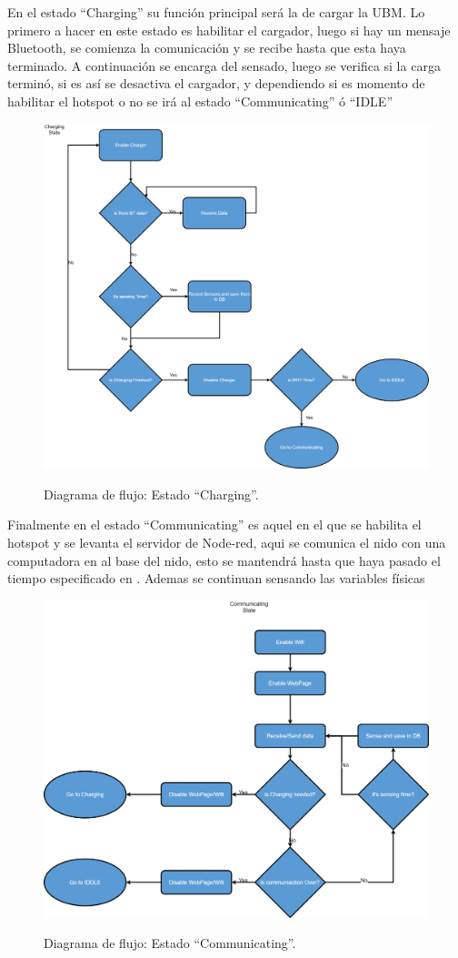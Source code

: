 En el estado ``Charging'' su funci\'on principal ser\'a la de cargar la UBM. Lo primero a hacer en este estado es habilitar el cargador, luego si hay un mensaje Bluetooth, se comienza la comunicaci\'on y se recibe hasta que esta haya terminado. A continuaci\'on se encarga del sensado, luego se verifica si la carga termin\'o, si es as\'i se desactiva el cargador, y dependiendo si es momento de habilitar el hotspot o no se ir\'a al estado ``Communicating'' \'o ``IDLE''
\begin{figure}[H]
	\centering
	\includegraphics[width=0.9\linewidth]{ImagenesIngenieria de Detalle/diagrama_flujo_charging}
	\label{fig:Diagrama_de_flujo_charging}
	\caption{Diagrama de flujo: Estado ``Charging''.}
\end{figure}
Finalmente en el estado ``Communicating'' es aquel en el que se habilita el hotspot y se levanta el servidor de Node-red, aqui se comunica el nido con una computadora en al base del nido, esto se mantendr\'a hasta que haya pasado el tiempo especificado en . Ademas se continuan sensando las variables f\'isicas
\begin{figure}[H]
	\centering
	\includegraphics[width=0.9\linewidth]{ImagenesIngenieria de Detalle/diagrama_flujo_communicating}
	\label{fig:diagrama_flujo_communicating}
	\caption{Diagrama de flujo: Estado ``Communicating''.}
\end{figure}